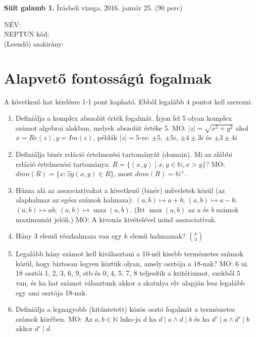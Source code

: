 \documentclass[11pt,a4paper]{article}
\begin{document}
\thispagestyle{empty}

\begin{center}
\begin{large}
\noindent \textbf{Sült galamb 1.} Írásbeli vizsga, 2016. január 25. (90 perc)
\end{large}
\end{center}

{\noindent NÉV: \\ NEPTUN kód:\\ (Leendő) szakirány:\\}
\section{Alapvető fontosságú fogalmak}
A következő hat kérdésre 1-1 pont kapható. Ebből legalább 4 pontot kell szerezni.
\begin{enumerate}

\item Definiálja a komplex abszolút érték fogalmát. Írjon fel 5 olyan
  komplex számot algebrai alakban, melyek abszolút értéke
  $5$. MO: $|z| = \sqrt{x^2+y^2}$ ahol
  $x=Re(z),y=Im(z)$, példák $|z|=5$-re:
  $\pm 5$, $\pm 5i$, $\pm 4 \pm 3i$ és $\pm 3 \pm 4i$
\item Definiálja binér reláció értelmezési tartományát (domain). Mi az
  alábbi reláció értelmezési tartománya:
  $R = \{ (x,y)\mid x,y\in \mathbb{N}, x> y\}$? MO:
  $dmn(R) =\{x : \exists y (x,y)\in R\}$, most $dmn(R)=\mathbb{N}^+$.
\item Húzza alá az asszociatívakat a következő (binér) műveletek közül
  (az alap\-halmaz az egész számok halmaza): $(a,b)\mapsto a+b$;
  $(a,b)\mapsto a-b$; $(a,b)\mapsto ab$; $(a,b)\mapsto
  \max(a,b)$. (Itt $\max(a,b)$ az $a$ és $b$ számok maximumát
  jelöli.) MO: A kivonás kivételével mind asszociatívak.
\item Hány 3 elemű rész\-halmaza van egy $k$ elemű halmaznak?
  $\binom{k}{3}$
\item Legalább hány számot kell kiválasztani a 10-nél kisebb
  természetes számok közül, hogy biztosan legyen köztük olyan, amely
  osztója a $18$-nak? MO: 6 ui. 18 osztói 1, 2, 3, 6, 9, stb és 0, 4,
  5, 7, 8 teljesítik a kritériumot, ezekből 5 van, és ha hat számot
  választunk akkor a skatulya elv alapján lesz legalább egy ami
  osztója 18-nak.
\item Definiálja a legnagyobb (kitüntetett) közös osztó fogalmát a
  természetes számok körében. MO: Az $a,b\in\mathbb{N}$ lnko-ja $d$ ha
  $d\mid a \land d \mid b$ és ha $d' \mid a \land d' \mid b$ akkor
  $d' \mid d$.
\end{enumerate}
\end{document}
